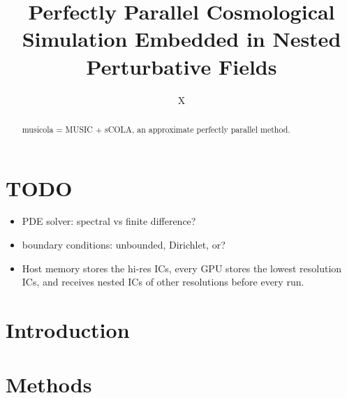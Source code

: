 \documentclass[modern, trackchanges, dvipsnames]{aastex631}
\newcommand{\gkai}[1]{\begin{CJK*}{UTF8}{gkai}\raisebox{.1em}{(}#1\raisebox{.1em}{)}\end{CJK*}}
\begin{document}
\title{\large Perfectly Parallel Cosmological Simulation Embedded in Nested Perturbative Fields
\vspace{0.3em}}


\author[0000-0000-0000-0000]{\normalsize X}
%
%
%







\begin{abstract}

musicola = MUSIC + sCOLA, an approximate perfectly parallel method.

\end{abstract}



\section*{TODO}
\begin{itemize}
\item PDE solver: spectral vs finite difference?
\item boundary conditions: unbounded, Dirichlet, or?
\item Host memory stores the hi-res ICs, every GPU stores the lowest
  resolution ICs, and receives nested ICs of other resolutions before
  every run.
\end{itemize}



\vspace{1em}
\section{Introduction}


\vspace{1em}
\section{Methods}
\label{sec:method}
\end{document}
